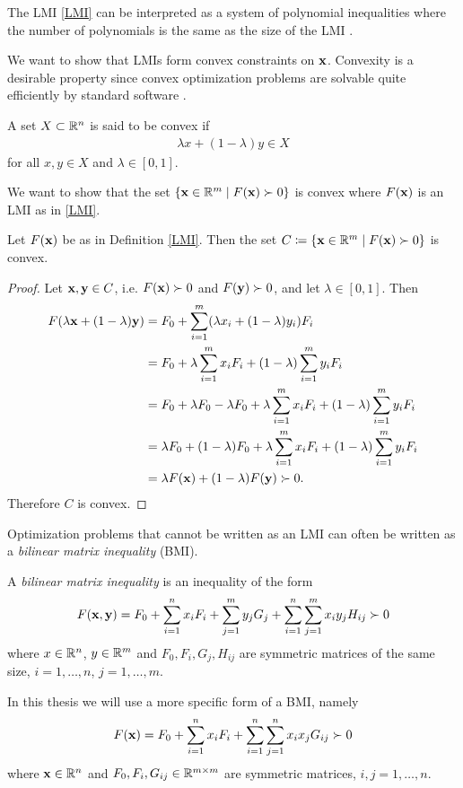 \documentclass[a4paper,12pt,twoside,BCOR=10mm]{scrbook}
\begin{document}
The LMI \eqref{LMI} can be interpreted as a system of polynomial inequalities where the number of polynomials is the same as the size of the LMI \citep{vABr2000lmibmi}.

We want to show that LMIs form convex constraints on $\mathbf{x}$. Convexity is a desirable property since convex optimization problems are solvable quite efficiently by standard software \citep{vABr2000lmibmi}.
\begin{definition}\label{Kýptni}
A set $X \subset \mathbb{R}^{n}$ is said to be convex if
    \begin{align*}
        \lambda x + (1 - \lambda)y \in X
    \end{align*}
for all $x,y\in X$ and $\lambda \in [0,1]$.
\end{definition}
We want to show that the set $\{\mathbf{x}\in\mathbb{R}^{m} \mid F(\mathbf{x}) \succ 0\}$ is convex where $F(\mathbf{x})$ is an LMI as in \eqref{LMI}.
\begin{theorem}\label{KýptniLMI}
Let $F(\mathbf{x})$ be as in Definition \ref{LMI}. Then the set $C \coloneqq \{\mathbf{x}\in\mathbb{R}^{m} \mid F(\mathbf{x}) \succ 0\}$ is convex.
\end{theorem}
\begin{proof}
Let $\mathbf{x}, \mathbf{y} \in C$, i.e. $F(\mathbf{x}) \succ 0$ and $F(\mathbf{y}) \succ 0$, and let $\lambda \in [0,1]$. Then
\begin{align*}
    F(\lambda\mathbf{x} + (1 - \lambda)\mathbf{y}) &= F_0 + \sum\limits_{i = 1}^m (\lambda x_i + (1 - \lambda)y_i)F_i\\
    &= F_0 + \lambda \sum\limits_{i = 1}^m x_i F_i + (1 - \lambda)\sum\limits_{i = 1}^m y_i F_i\\
    &= F_0 + \lambda F_0 - \lambda F_0 + \lambda \sum\limits_{i = 1}^m x_i F_i + (1 - \lambda)\sum\limits_{i = 1}^m y_i F_i\\
    &= \lambda F_0 + (1 - \lambda) F_0 + \lambda \sum\limits_{i = 1}^m x_i F_i + (1 - \lambda)\sum\limits_{i = 1}^m y_i F_i\\
    &= \lambda F(\mathbf{x}) + (1 - \lambda)F(\mathbf{y}) \succ 0.
\end{align*}
Therefore $C$ is convex.
\end{proof}

Optimization problems that cannot be written as an LMI can often be written as a \textit{bilinear matrix inequality} (BMI).

\begin{definition}\label{BMIDefinitionGeneral}
A \textit{bilinear matrix inequality} is an inequality of the form
    \begin{align}
        F(\mathbf{x}, \mathbf{y}) = F_0 + \sum_{i = 1}^nx_iF_i + \sum_{j = 1}^m y_jG_j + \sum_{i = 1}^n \sum_{j = 1}^m x_iy_j H_{ij} \succ 0
    \end{align}
where $x\in \mathbb{R}^{n}$, $y\in \mathbb{R}^{m}$ and $F_0, F_i, G_j, H_{ij}$ are symmetric matrices of the same size, $i = 1, \ldots, n$, $j = 1, \ldots, m$.
\end{definition}
In this thesis we will use a more specific form of a BMI, namely
\begin{align}\label{BMIDefinition}
    F(\mathbf{x}) = F_0 + \sum_{i = 1}^n x_i F_i + \sum_{i = 1}^n \sum_{j = 1}^n x_ix_j G_{ij} \succ 0
\end{align}
where $\mathbf{x} \in \mathbb{R}^{n}$ and $F_0, F_i, G_{ij} \in \mathbb{R}^{m \times m}$ are symmetric matrices, $i,j = 1, \ldots, n$.
\end{document}
